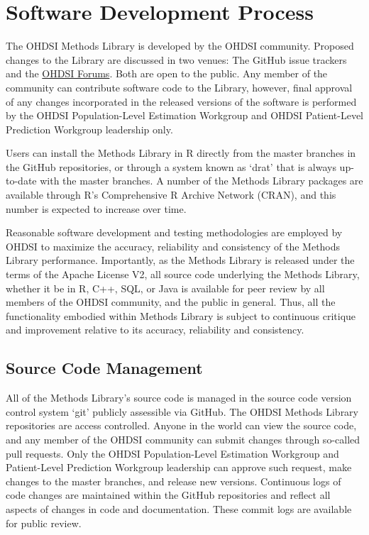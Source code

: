 \documentclass[11pt]{book}
\begin{document}
\section{Software Development
Process}\label{software-development-process}

The OHDSI Methods Library is developed by the OHDSI community. Proposed
changes to the Library are discussed in two venues: The GitHub issue
trackers and the \href{http://forums.ohdsi.org/}{OHDSI Forums}. Both are
open to the public. Any member of the community can contribute software
code to the Library, however, final approval of any changes incorporated
in the released versions of the software is performed by the OHDSI
Population-Level Estimation Workgroup and OHDSI Patient-Level Prediction
Workgroup leadership only.

Users can install the Methods Library in R directly from the master
branches in the GitHub repositories, or through a system known as `drat'
that is always up-to-date with the master branches. A number of the
Methods Library packages are available through R's Comprehensive R
Archive Network (CRAN), and this number is expected to increase over
time.

Reasonable software development and testing methodologies are employed
by OHDSI to maximize the accuracy, reliability and consistency of the
Methods Library performance. Importantly, as the Methods Library is
released under the terms of the Apache License V2, all source code
underlying the Methods Library, whether it be in R, C++, SQL, or Java is
available for peer review by all members of the OHDSI community, and the
public in general. Thus, all the functionality embodied within Methods
Library is subject to continuous critique and improvement relative to
its accuracy, reliability and consistency.

\subsection{Source Code Management}\label{source-code-management}

All of the Methods Library's source code is managed in the source code
version control system `git' publicly assessible via GitHub. The OHDSI
Methods Library repositories are access controlled. Anyone in the world
can view the source code, and any member of the OHDSI community can
submit changes through so-called pull requests. Only the OHDSI
Population-Level Estimation Workgroup and Patient-Level Prediction
Workgroup leadership can approve such request, make changes to the
master branches, and release new versions. Continuous logs of code
changes are maintained within the GitHub repositories and reflect all
aspects of changes in code and documentation. These commit logs are
available for public review.
\end{document}
